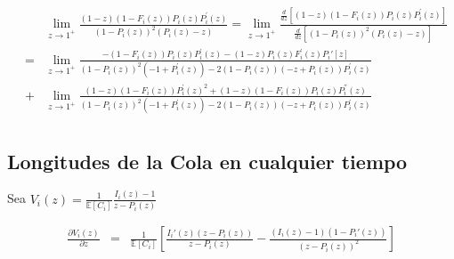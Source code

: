 \documentclass{article}
\newcommand{\esp}{\mathbb{E}}
\begin{document}
\begin{eqnarray*}
&&\lim_{z\rightarrow1^{+}}\frac{\left(1-z\right)\left(1-F_{i}\left(z\right)\right)P_{i}\left(z\right)P_{i}^{'}\left(z\right)}{\left(1-P_{i}\left(z\right)\right)^{2}\left(P_{i}\left(z\right)-z\right)}=\lim_{z\rightarrow1^{+}}\frac{\frac{d}{dz}\left[\left(1-z\right)\left(1-F_{i}\left(z\right)\right)P_{i}\left(z\right)P_{i}^{'}\left(z\right)\right]}{\frac{d}{dz}\left[\left(1-P_{i}\left(z\right)\right)^{2}\left(P_{i}\left(z\right)-z\right)\right]}\\
&=&\lim_{z\rightarrow1^{+}}\frac{-\left(1-F_{i}\left(z\right)\right) P_{i}\left(z\right) P_{i}^{'}\left(z\right)-(1-z) P_{i}\left(z\right) F_{i}^{'}\left(z\right)P_i'[z]}{\left(1-P_{i}\left(z\right)\right)^2 \left(-1+P_{i}^{'}\left(z\right)\right)-2 \left(1-P_{i}\left(z\right)\right) \left(-z+P_{i}\left(z\right)\right) P_{i}^{'}\left(z\right)}\\
&+&\lim_{z\rightarrow1^{+}}\frac{(1-z) \left(1-F_{i}\left(z\right)\right) P_{i}^{'}\left(z\right)^2+(1-z) \left(1-F_{i}\left(z\right)\right) P_{i}\left(z\right) P_{i}^{''}\left(z\right)}{\left(1-P_{i}\left(z\right)\right)^2 \left(-1+P_{i}^{'}\left(z\right)\right)-2 \left(1-P_{i}\left(z\right)\right) \left(-z+P_{i}\left(z\right)\right) P_{i}^{'}\left(z\right)}\\
\end{eqnarray*}

\subsection{Longitudes de la Cola en cualquier tiempo}

Sea
$V_{i}\left(z\right)=\frac{1}{\esp\left[C_{i}\right]}\frac{I_{i}\left(z\right)-1}{z-P_{i}\left(z\right)}$


\begin{eqnarray*}
\frac{\partial V_{i}\left(z\right)}{\partial z}&=&\frac{1}{\esp\left[C_{i}\right]}\left[\frac{I_{i}{'}\left(z\right)\left(z-P_{i}\left(z\right)\right)}{z-P_{i}\left(z\right)}-\frac{\left(I_{i}\left(z\right)-1\right)\left(1-P_{i}{'}\left(z\right)\right)}{\left(z-P_{i}\left(z\right)\right)^{2}}\right]
\end{eqnarray*}
\end{document}
